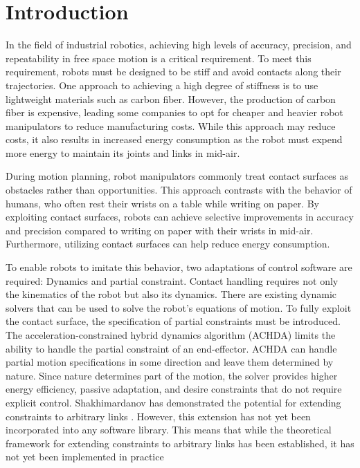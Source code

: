 \documentclass[report.tex]{subfiles}
\begin{document}
    \chapter{Introduction}
    In the field of industrial robotics, achieving high levels of accuracy, precision, and repeatability in free space motion is a critical requirement. To meet this requirement, robots must be designed to be stiff and avoid contacts along their trajectories. One approach to achieving a high degree of stiffness is to use lightweight materials such as carbon fiber. However, the production of carbon fiber is expensive, leading some companies to opt for cheaper and heavier robot manipulators to reduce manufacturing costs. While this approach may reduce costs, it also results in increased energy consumption as the robot must expend more energy to maintain its joints and links in mid-air.

    During motion planning, robot manipulators commonly treat contact surfaces as obstacles rather than opportunities. This approach contrasts with the behavior of humans, who often rest their wrists on a table while writing on paper. By exploiting contact surfaces, robots can achieve selective improvements in accuracy and precision compared to writing on paper with their wrists in mid-air. Furthermore, utilizing contact surfaces can help reduce energy consumption.
    
    To enable robots to imitate this behavior, two adaptations of control software are required: Dynamics and partial constraint. Contact handling requires not only the kinematics of the robot but also its dynamics. There are existing dynamic solvers that can be used to solve the robot’s equations of motion. To fully exploit the contact surface, the specification of partial constraints must be introduced. The acceleration-constrained hybrid dynamics algorithm (ACHDA) limits the ability to handle the partial constraint of an end-effector. ACHDA can handle partial motion specifications in some direction and leave them determined by nature. Since nature determines part of the motion, the solver provides higher energy efficiency, passive adaptation, and desire constraints that do not require explicit control. Shakhimardanov has demonstrated the potential for extending constraints to arbitrary links \cite{Shakhimardanov2015}. However, this extension has not yet been incorporated into any software library. This means that while the theoretical framework for extending constraints to arbitrary links has been established, it has not yet been implemented in practice
    
\end{document}
